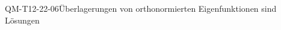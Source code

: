 
\begin{CONC}{QM-T12-22-06}{Überlagerungen von orthonormierten Eigenfunktionen sind Lösungen}
\end{CONC}
